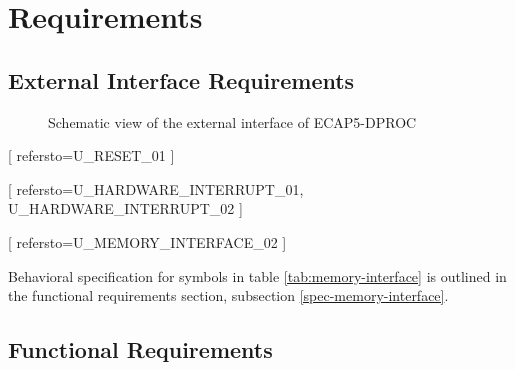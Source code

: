 \section{Requirements}

\subsection{External Interface Requirements}

\begin{figure}[h!]
    \centering
    
    \caption{Schematic view of the external interface of ECAP5-DPROC}
    \label{fig:externalinterface}
\end{figure}

\begin{table}[H]
  \centering
  
  \caption{ECAP5-DPROC control signals}
  \label{tab:control-interface}
\end{table}

\begin{table}[H]
  \centering
  
  \caption{ECAP5-DPROC memory interface signals}
  \label{tab:memory-interface}
\end{table}


[
  refersto=U\_RESET\_01
]


[
  refersto={U\_HARDWARE\_INTERRUPT\_01, U\_HARDWARE\_INTERRUPT\_02}
]


[
  refersto=U\_MEMORY\_INTERFACE\_02
]

\begin{content}
  Behavioral specification for symbols in table \ref{tab:memory-interface} is outlined in the functional requirements section, subsection \ref{spec-memory-interface}.
\end{content}

\subsection{Functional Requirements}

